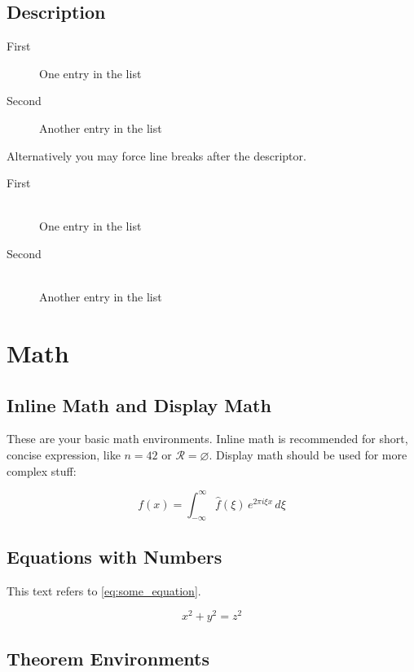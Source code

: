 \documentclass[parskip=half]{scrbook}
\let\emptyset\varnothing
\begin{document}
\subsection{Description}

\begin{description}
	\item[First] One entry in the list
	\item[Second] Another entry in the list
\end{description}

Alternatively you may force line breaks after the descriptor.

\begin{description}
	\item[First]\hfill\\
	      One entry in the list
	\item[Second]\hfill\\
	      Another entry in the list
\end{description}

\section{Math}

\subsection{Inline Math and Display Math}

These are your basic math environments.
Inline math is recommended for short, concise expression, like $n = 42$ or $\mathcal{R} = \emptyset$.
Display math should be used for more complex stuff:

$$f(x) = \int_{-\infty}^\infty \hat f(\xi)\,e^{2 \pi i \xi x} \,d\xi$$

\subsection{Equations with Numbers}

This text refers to \cref{eq:some_equation}.

\begin{equation}\label{eq:some_equation}
	x^2 + y^2 = z^2
\end{equation}

\subsection{Theorem Environments}
\end{document}
